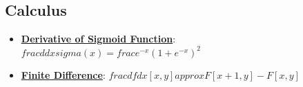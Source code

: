 \documentclass{article}%
\begin{document}
%
\subsection{Calculus}%
\label{subsec:Calculus}%
\begin{itemize}[leftmargin=*]%
\item \href{https://purdue.brightspace.com/d2l/common/assets/pdfjs-d2l-dist/1.0.14-legacy/web/viewer.html?file=\%2Fcontent\%2Fenforced\%2F1095467-wl.202510.CS.24300.001\%2F04L1-Linear Algebra Primer.pdf\%3Fou\%3D1095467\&lang=en-us\&container=d2l-fileviewer-rendered-pdf\&fullscreen=d2l-fileviewer-rendered-pdf-dialog\&height=667#page=21}{\textbf{Derivative of Sigmoid Function}}: $ frac{d}{dx}  sigma(x) =  frac{e^{-x}}{(1 + e^{-x})^2}$%
\item \href{https://purdue.brightspace.com/d2l/common/assets/pdfjs-d2l-dist/1.0.14-legacy/web/viewer.html?file=\%2Fcontent\%2Fenforced\%2F1095467-wl.202510.CS.24300.001\%2F08L2-Feature Extraction.pdf\%3Fou\%3D1095467\&lang=en-us\&container=d2l-fileviewer-rendered-pdf\&fullscreen=d2l-fileviewer-rendered-pdf-dialog\&height=667#page=15}{\textbf{Finite Difference}}: $ frac{df}{dx} [x, y]  approx F[x + 1, y] - F[x, y]$%
\end{itemize}

%
\end{document}
